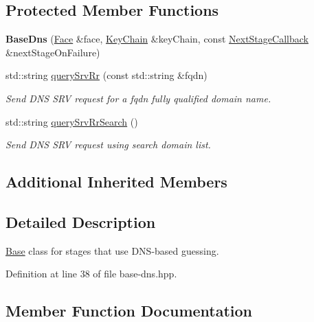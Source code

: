\subsection*{Protected Member Functions}
\begin{DoxyCompactItemize}
\item 
{\bfseries Base\+Dns} (\hyperlink{classndn_1_1Face}{Face} \&face, \hyperlink{classndn_1_1security_1_1KeyChain}{Key\+Chain} \&key\+Chain, const \hyperlink{classndn_1_1tools_1_1autoconfig_1_1Base_a1b9466e64370f1ead34b754096562445}{Next\+Stage\+Callback} \&next\+Stage\+On\+Failure)\hypertarget{classndn_1_1tools_1_1autoconfig_1_1BaseDns_a56bc40ad4af9115bee29f61b945ef713}{}\label{classndn_1_1tools_1_1autoconfig_1_1BaseDns_a56bc40ad4af9115bee29f61b945ef713}

\item 
std\+::string \hyperlink{classndn_1_1tools_1_1autoconfig_1_1BaseDns_a334f3f261aa393cffa549c64d2718dcf}{query\+Srv\+Rr} (const std\+::string \&fqdn)
\begin{DoxyCompactList}\small\item\em Send D\+NS S\+RV request for a {\ttfamily fqdn} fully qualified domain name. \end{DoxyCompactList}\item 
std\+::string \hyperlink{classndn_1_1tools_1_1autoconfig_1_1BaseDns_aef6589557c571a388e42f9fd592f7499}{query\+Srv\+Rr\+Search} ()
\begin{DoxyCompactList}\small\item\em Send D\+NS S\+RV request using search domain list. \end{DoxyCompactList}\end{DoxyCompactItemize}
\subsection*{Additional Inherited Members}


\subsection{Detailed Description}
\hyperlink{classndn_1_1tools_1_1autoconfig_1_1Base}{Base} class for stages that use D\+N\+S-\/based guessing. 

Definition at line 38 of file base-\/dns.\+hpp.



\subsection{Member Function Documentation}
